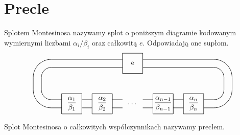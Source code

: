 \section{Precle} %
\label{sec:pretzel}
\begin{definition}
	Splotem Montesinosa nazywamy splot o poniższym diagramie
	kodowanym wymiernymi liczbami $\alpha_i/\beta_i$ oraz całkowitą $e$.
	Odpowiadają one supłom.
	\[
	\begin{tikzpicture}[baseline=-0.65ex, scale=0.1]
		\draw[semithick] (-5, 5) rectangle (5, 15);
		\foreach \x in {0,1,3,4} {
			\draw[semithick] (15*\x-35, -15) rectangle (15*\x-25, -5);
		}
		\foreach \x in {0,1,2,3,4,5} {
			\draw[semithick] (15*\x-35, -8) to (15*\x-40, -8);
			\draw[semithick] (15*\x-35, -12) to (15*\x-40, -12);
		}
		\draw[semithick] (-40, -8) [in=down, out=left] to (-45, -3);
		\draw[semithick] (-40, -12) [in=down, out=left] to (-49, -3);

		\draw[semithick] (-40, 8) [in=up, out=left] to (-45, 3);
		\draw[semithick] (-40, 12) [in=up, out=left] to (-49, 3);

		\draw[semithick] (40, 8) [in=up, out=right] to (45, 3);
		\draw[semithick] (40, 12) [in=up, out=right] to (49, 3);

		\draw[semithick] (40, -8) [in=down, out=right] to (45, -3);
		\draw[semithick] (40, -12) [in=down, out=right] to (49, -3);

		\draw[semithick] (-45, -3)  to (-45, 3);
		\draw[semithick] (-49, -3)  to (-49, 3);
		\draw[semithick] (45, -3)  to (45, 3);
		\draw[semithick] (49, -3)  to (49, 3);

		\draw[semithick] (-5, 8)  to (-40, 8);
		\draw[semithick] ( 5, 8)  to ( 40, 8);
		\draw[semithick] (-5, 12)  to (-40, 12);
		\draw[semithick] ( 5, 12)  to ( 40, 12);

		\node at (0, 10) {e};
		\node at (0, -10) {\ldots};
		\node at (-15, -10) {$\displaystyle \frac{\alpha_2}{\beta_2}$};
		\node at (-30, -10) {$\displaystyle \frac{\alpha_1}{\beta_1}$};
		\node at (15, -10) {$\displaystyle \frac{\alpha_{n-1}}{\beta_{n-1}}$};
		\node at (30, -10) {$\displaystyle \frac{\alpha_n}{\beta_n}$};
	\end{tikzpicture}
	\]
\end{definition}

\begin{definition}
	\label{def:pretzel}
	Splot Montesinosa o całkowitych współczynnikach nazywamy preclem.
\end{definition}

